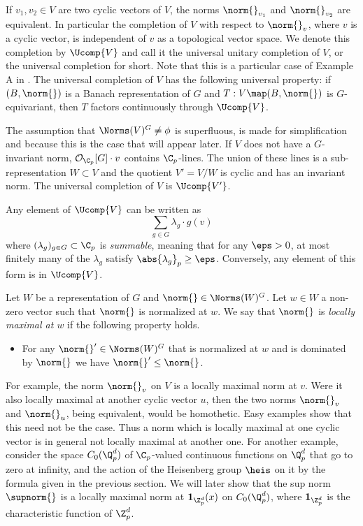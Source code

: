 If $v_1,v_2\in V$ are two cyclic vectors of $V$, the norms $\norm{}_{v_1}$ and $\norm{}_{v_2}$ are equivalent.
In particular the completion of $V$ with respect to $\norm{}_v$, where $v$ is a cyclic vector, is independent of $v$ as a topological vector space.
We denote this completion by $\Ucomp{V}$ and call it the universal unitary completion of $V$, or the universal completion for short. 
Note that this is a particular case of Example A in \cite{emerton2005p}.
The universal completion of $V$ has the following universal property: if $(B,\norm{})$ is a Banach representation of $G$ and $T:V\map (B,\norm{})$ is  $G$-equivariant, then $T$ factors continuously through $\Ucomp{V}$.

    \begin{remark}
    The assumption that $\Norms(V)^G\neq \phi$ is superfluous, is made for simplification and because this is the case that will appear later.
    If $V$ does not have a $G$-invariant norm, $\mathcal{O}_{\C_p}[G]\cdot v$ contains $\C_p$-lines.
    The union of these lines is a sub-representation $W\subset V$ and the quotient $V'=V/W$ is cyclic and has an invariant norm.
    The universal completion of $V$ is $\Ucomp{V'}$.    
    \end{remark} 

Any element of $\Ucomp{V}$ can be written as 
\[\sum_{g\in G}\lambda_g\cdot g(v)\]
where $(\lambda_g)_{g\in G}\subset \C_p$ is \textit{summable}, meaning that for any $\eps>0$, at most finitely many of the $\lambda_g$ satisfy $\abs{\lambda_g}_p\geq \eps$.
Conversely, any element of this form is in $\Ucomp{V}$.

\begin{defn}\label{def_local_maximality}
Let $W$ be a representation of $G$ and $\norm{}\in\Norms(W)^G$.
Let $w\in W$ a non-zero vector such that $\norm{}$ is normalized at $w$.
We say that $\norm{}$ is \textit{locally maximal at $w$} if the following property holds.
    \begin{itemize}
    \item For any $\norm{}'\in \Norms(W)^G$ that is normalized at $w$ and is dominated by $\norm{}$ we have $\norm{}'\leq \norm{}$.
    \end{itemize}
\end{defn} 
For example, the norm $\norm{}_v$ on $V$ is a locally maximal norm at $v$.
Were it also locally maximal at another cyclic vector $u$, then the two norms $\norm{}_v$ and $\norm{}_u$, being equivalent, would be homothetic.
Easy examples show that this need not be the case.
Thus a norm which is locally maximal at one cyclic vector is in general not locally maximal at another one.
For another example, consider the space $C_0(\Q_p^d)$ of $\C_p$-valued continuous functions on $\Q_p^d$ that go to zero at infinity, and the action of the Heisenberg group $\heis$ on it by the formula given in the previous section.
We will later show that the sup norm $\supnorm{}$ is a locally maximal norm at $\textbf{1}_{\Z_p^d}(x)$ on $C_0(\Q_p^d)$, where $\textbf{1}_{\Z_p^d}$ is the characteristic function of $\Z_p^d$.

